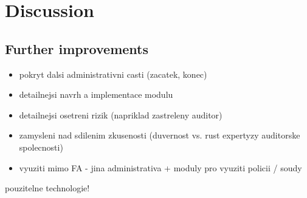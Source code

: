 \newcommand{\komentar}[1]{{\leavevmode\color[rgb]{1.0, 0.13, 0.32}#1}}
\newcommand{\sediva}[1]{{\leavevmode\color[rgb]{0.5, 0.5, 0.5}#1}}
\newcommand{\dotaz}[1]{{\leavevmode\color[rgb]{0.0, 0.5, 1.0}DOTAZ: #1\\}}
\newcommand{\anglictina}[1]{{\colorbox{green}{[AJ!] \leavevmode\color[rgb]{0.0, 0.0, 0.0}#1 }}}


\setcounter{chapter}{0}
\setcounter{section}{1}

 

















\chapter{Discussion}
\komentar{
	\section{Further improvements}
\begin{itemize}
	\item pokryt dalsi administrativni casti (zacatek, konec)
	\item detailnejsi navrh a implementace modulu
	\item detailnejsi osetreni rizik (napriklad zastreleny auditor)
	\item zamysleni nad sdilenim zkusenosti (duvernost vs. rust expertyzy auditorske spolecnosti)
	\item vyuziti mimo FA - jina administrativa + moduly pro vyuziti policii / soudy
\end{itemize}
	
	
	pouzitelne technologie!
}



